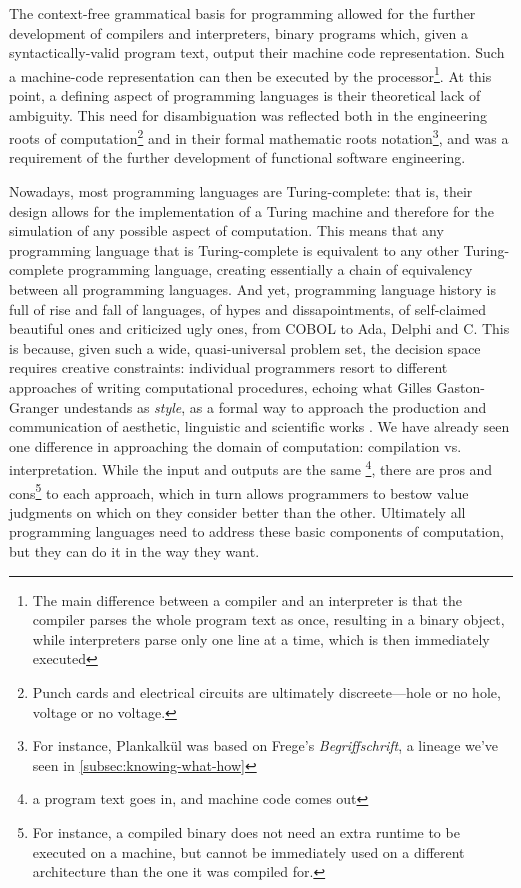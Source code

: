 The context-free grammatical basis for programming allowed for the further development of compilers and interpreters, binary programs which, given a syntactically-valid program text, output their machine code representation. Such a machine-code representation can then be executed by the processor\footnote{The main difference between a compiler and an interpreter is that the compiler parses the whole program text as once, resulting in a binary object, while interpreters parse only one line at a time, which is then immediately executed}. At this point, a defining aspect of programming languages is their theoretical lack of ambiguity. This need for disambiguation was reflected both in the engineering roots of computation\footnote{Punch cards and electrical circuits are ultimately discreete—hole or no hole, voltage or no voltage.} and in their formal mathematic roots notation\footnote{For instance, Plankalkül was based on Frege's \emph{Begriffschrift}, a lineage we've seen in \ref{subsec:knowing-what-how}}, and was a requirement of the further development of functional software engineering.

Nowadays, most programming languages are Turing-complete: that is, their design allows for the implementation of a Turing machine and therefore for the simulation of any possible aspect of computation. This means that any programming language that is Turing-complete is equivalent to any other Turing-complete programming language, creating essentially a chain of equivalency between all programming languages. And yet, programming language history is full of rise and fall of languages, of hypes and dissapointments, of self-claimed beautiful ones and criticized ugly ones, from COBOL to Ada, Delphi and C. This is because, given such a wide, quasi-universal problem set, the decision space requires creative constraints: individual programmers resort to different approaches of writing computational procedures, echoing what Gilles Gaston-Granger undestands as \emph{style}, as a formal way to approach the production and communication of aesthetic, linguistic and scientific works \citep{granger_essai_1988}. We have already seen one difference in approaching the domain of computation: compilation vs. interpretation. While the input and outputs are the same \footnote{a program text goes in, and machine code comes out}, there are pros and cons\footnote{For instance, a compiled binary does not need an extra runtime to be executed on a machine, but cannot be immediately used on a different architecture than the one it was compiled for.} to each approach, which in turn allows programmers to bestow value judgments on which on they consider better than the other. Ultimately all programming languages need to address these basic components of computation, but they can do it in the way they want.

